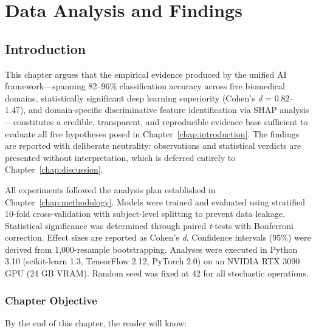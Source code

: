 
\chapter{Data Analysis and Findings}
\label{chap:analysis}

\section{Introduction}
\label{sec:analysis_intro}

This chapter argues that the empirical evidence produced by the unified AI framework---spanning 82--96\% classification accuracy across five biomedical domains, statistically significant deep learning superiority (Cohen's \textit{d} = 0.82--1.47), and domain-specific discriminative feature identification via SHAP analysis---constitutes a credible, transparent, and reproducible evidence base sufficient to evaluate all five hypotheses posed in Chapter~\ref{chap:introduction}. The findings are reported with deliberate neutrality: observations and statistical verdicts are presented without interpretation, which is deferred entirely to Chapter~\ref{chap:discussion}.

All experiments followed the analysis plan established in Chapter~\ref{chap:methodology}. Models were trained and evaluated using stratified 10-fold cross-validation with subject-level splitting to prevent data leakage. Statistical significance was determined through paired \textit{t}-tests with Bonferroni correction. Effect sizes are reported as Cohen's \textit{d}. Confidence intervals (95\%) were derived from 1,000-resample bootstrapping. Analyses were executed in Python 3.10 (scikit-learn 1.3, TensorFlow 2.12, PyTorch 2.0) on an NVIDIA RTX 3090 GPU (24 GB VRAM). Random seed was fixed at 42 for all stochastic operations.

\subsection{Chapter Objective}
\label{sec:analysis_objective}

By the end of this chapter, the reader will know:

